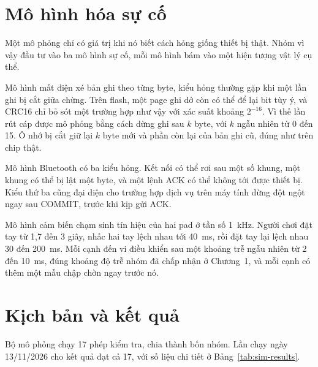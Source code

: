 \section{Mô hình hóa sự cố}
Một mô phỏng chỉ có giá trị khi nó biết cách hỏng giống thiết bị thật. Nhóm vì vậy đầu tư vào ba mô hình sự cố, mỗi mô hình bám vào một hiện tượng vật lý cụ thể.

Mô hình mất điện xé bản ghi theo từng byte, kiểu hỏng thường gặp khi một lần ghi bị cắt giữa chừng. Trên flash, một page ghi dở còn có thể để lại bit tùy ý, và CRC16 chỉ bỏ sót một trường hợp như vậy với xác suất khoảng $2^{-16}$. Vì thế lần rút cáp được mô phỏng bằng cách dừng ghi sau $k$ byte, với $k$ ngẫu nhiên từ 0 đến 15. Ô nhớ bị cắt giữ lại $k$ byte mới và phần còn lại của bản ghi cũ, đúng như trên chip thật.

Mô hình Bluetooth có ba kiểu hỏng. Kết nối có thể rơi sau một số khung, một khung có thể bị lật một byte, và một lệnh ACK có thể không tới được thiết bị. Kiểu thứ ba cũng đại diện cho trường hợp dịch vụ trên máy tính dừng đột ngột ngay sau COMMIT, trước khi kịp gửi ACK.

Mô hình cảm biến chạm sinh tín hiệu của hai pad ở tần số 1~kHz. Người chơi đặt tay từ 1,7 đến 3 giây, nhấc hai tay lệch nhau tới 40~ms, rồi đặt tay lại lệch nhau 30 đến 200~ms. Mỗi cạnh đến vi điều khiển sau một khoảng trễ ngẫu nhiên từ 2 đến 10~ms, đúng khoảng độ trễ nhóm đã chấp nhận ở Chương~1, và mỗi cạnh có thêm một mẫu chập chờn ngay trước nó.

\section{Kịch bản và kết quả}
Bộ mô phỏng chạy 17 phép kiểm tra, chia thành bốn nhóm. Lần chạy ngày 13/11/2026 cho kết quả đạt cả 17, với số liệu chi tiết ở Bảng~\ref{tab:sim-results}.

